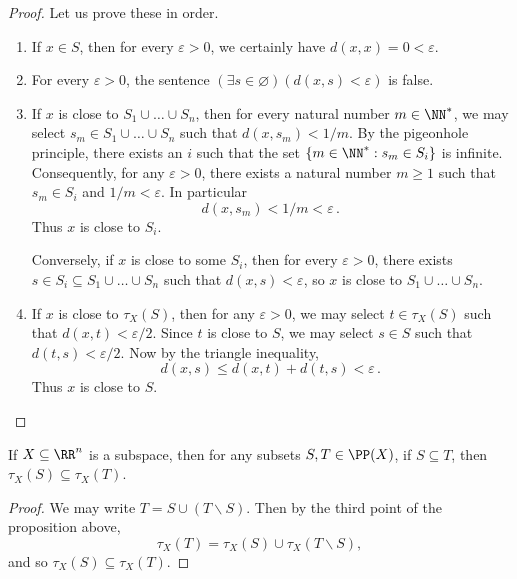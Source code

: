 \begin{proof}
	Let us prove these in order.
	\begin{enumerate}
		\item If $ x \in S$, then for every $\varepsilon>0$, we certainly have $d(x,x) = 0 < \varepsilon$.
		\item For every $\varepsilon>0$, the sentence%
			$(\exists s \in \varnothing)(d(x,s)<\varepsilon)$ is false.
		\item If $ x $ is close to $ S_1 \cup \dots \cup S_n $, then for every natural number%
			$ m \in \NN^{\ast} $, we may select $s_m \in S_1 \cup \dots \cup S_n $ such that $ d(x, s_m) < 1/m$.
			By the pigeonhole principle, there exists an $i$ such that the set $\{ m \in \NN^{\ast} : s_m \in S_i \}$ is infinite.
			Consequently, for any $\varepsilon>0$, there exists a natural number $m\geq 1$ such that $ s_m \in S_i$ and $1/m < \varepsilon$.
			In particular
			\[
				d(x,s_m) < 1/m < \varepsilon \period
			\]
			Thus $ x $ is close to $S_i$.

			Conversely, if $ x $ is close to some $S_i$, then for every $\varepsilon >0$, there exists $ s \in S_i \subseteq S_1 \cup \dots \cup S_n $ such that $ d(x,s) <\varepsilon $,
			so $ x $ is close to $S_1 \cup \dots \cup S_n$.
		\item If $ x $ is close to $ \tau_X(S)$, then for any $\varepsilon >0$, we may select $ t\in \tau_X(S)$ such that $d(x,t) < \varepsilon/2 $.
			Since $t$ is close to $S$, we may select $s \in S$ such that $d(t, s) < \varepsilon/2 $.
			Now by the triangle inequality,
			\[
				d(x, s) \leq d(x, t) + d(t, s) < \varepsilon \period
			\]
			Thus $ x$ is close to $S$.
	\end{enumerate}
\end{proof}

\begin{cor}%
\label{cor:tau_preserves_inclusion}
	If $X \subseteq \RR^n$ is a subspace, then for any subsets $S, T \in \PP(X)$, if $S \subseteq T$, then $\tau_X(S) \subseteq \tau_X(T)$.
\end{cor}

\begin{proof}
	We may write $ T = S \cup (T \smallsetminus S) $.
	Then by the third point of the proposition above,
	\[
		\tau_X(T) = \tau_X(S) \cup \tau_X(T \smallsetminus S) \comma
	\]
	and so $ \tau_X(S) \subseteq \tau_X(T)$.
\end{proof}

